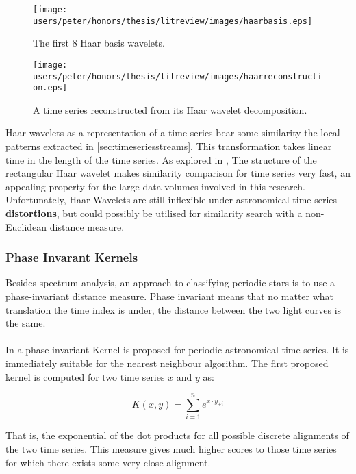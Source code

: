 	\begin{figure}[ht!]
	\centering
	\texttt{[image: users/peter/honors/thesis/litreview/images/haarbasis.eps]}
	\caption{The first 8 Haar basis wavelets.}
	\label{fig:haarwavelets}
	\end{figure}
	
	\begin{figure}[ht!]
	\centering
	\texttt{[image: users/peter/honors/thesis/litreview/images/haarreconstruction.eps]}
	\caption{A time series reconstructed from its Haar wavelet decomposition.}
	\label{fig:haarreconstruction}
	\end{figure}


	Haar wavelets as a representation of a time series bear some similarity the local patterns extracted in \ref{sec:timeseriesstreams}. This transformation takes linear time in the length of the time series. As explored in \citep{popivanov2002similarity}, The structure of the rectangular Haar wavelet makes similarity comparison for time series very fast, an appealing property for the large data volumes involved in this research. Unfortunately, Haar Wavelets are still inflexible under astronomical time series \textbf{distortions}, but could possibly be utilised for similarity search with a non-Euclidean distance measure.
	
	
	\subsubsection{Phase Invarant Kernels}
	Besides spectrum analysis, an approach to classifying periodic stars is to use a phase-invariant distance measure. Phase invariant means that no matter what translation the time index is under, the distance between the two light curves is the same.
	\paragraph{}
	In \citep{wachman2009kernels} a phase invariant Kernel is proposed for periodic astronomical time series. It is immediately suitable for the nearest neighbour algorithm. The first proposed kernel is computed for two time series $x$ and $y$ as:
	\begin{center}
	\begin{equation*}
		K(x,y) = \sum\limits_{i=1}^{n}e^{ x \cdot y_{+i}}
	\end{equation*}
	\end{center}
	That is, the exponential of the dot products for all possible discrete alignments of the two time series. 	This measure gives much higher scores to those time series for which there exists some very close alignment.

